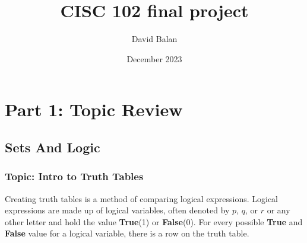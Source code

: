 \documentclass{article}
\title{CISC 102 final project}
\author{David Balan}
\date{December 2023}
\begin{document}
\maketitle


\newpage
\section{Part 1: Topic Review}
\subsection{Sets And Logic}
\subsubsection{Topic: Intro to Truth Tables}

Creating truth tables is a method of comparing logical expressions. Logical expressions are made up of logical variables, often denoted by $p$, $q$, or $r$ or any other letter and hold the value \textbf{True}(1) or \textbf{False}(0). For every possible \textbf{True} and \textbf{False} value for a logical variable, there is a row on the truth table.
\end{document}
